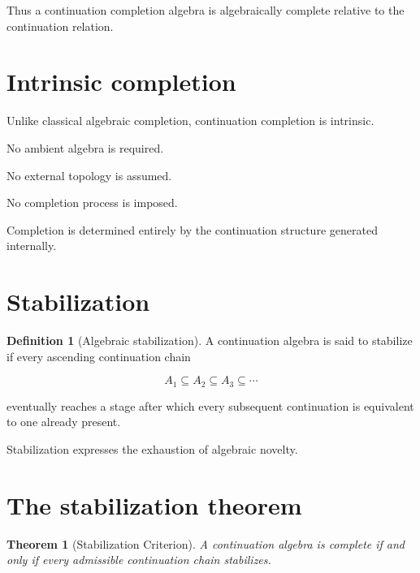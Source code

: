 \documentclass[13pt,openany]{book}
\theoremstyle{plain}
\newtheorem{theorem}{Theorem}[chapter]
\theoremstyle{definition}
\newtheorem{definition}{Definition}[chapter]
\begin{document}
Thus a continuation completion algebra is algebraically complete relative to
the continuation relation.

\section{Intrinsic completion}

Unlike classical algebraic completion, continuation completion is intrinsic.

No ambient algebra is required.

No external topology is assumed.

No completion process is imposed.

Completion is determined entirely by the continuation structure generated
internally.

\section{Stabilization}

\begin{definition}[Algebraic stabilization]
A continuation algebra is said to stabilize if every ascending continuation
chain

\[
A_1
\subseteq
A_2
\subseteq
A_3
\subseteq
\cdots
\]

eventually reaches a stage after which every subsequent continuation is
equivalent to one already present.
\end{definition}

Stabilization expresses the exhaustion of algebraic novelty.

\section{The stabilization theorem}

\begin{theorem}[Stabilization Criterion]

A continuation algebra is complete if and only if every admissible continuation
chain stabilizes.

\end{theorem}
\end{document}
